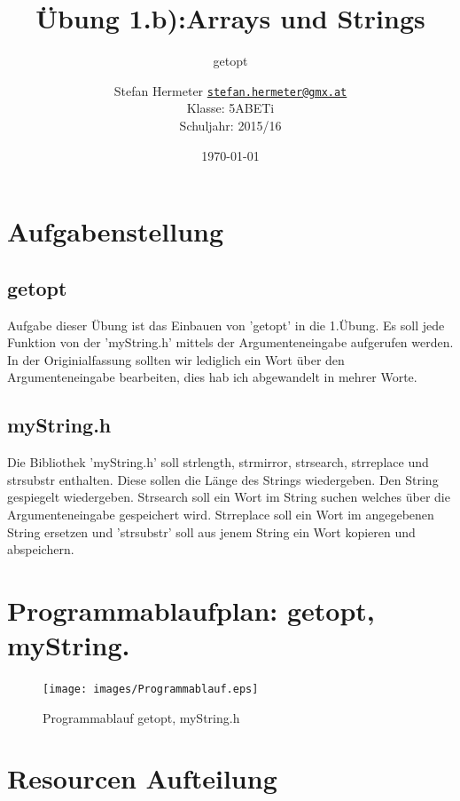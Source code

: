 \documentclass{scrartcl}
\newcommand{\mytitle}{Übung 1.b)}
\begin{document}
\title{\mytitle:Arrays und Strings}
\subtitle{getopt}
\date{\today}
\author{Stefan Hermeter \texttt{\href{mailto:stefan.hermeter@gmx.at}{stefan.hermeter@gmx.at}}\\
  Klasse: 5ABETi\\
  Schuljahr: 2015/16}
\maketitle
{}
\newpage
\tableofcontents
\listoffigures
\newpage
{}
\section{Aufgabenstellung}
\subsection{getopt}
Aufgabe dieser Übung ist das Einbauen von 'getopt' in die 1.Übung. Es soll jede Funktion von der 'myString.h' mittels der Argumenteneingabe aufgerufen werden. In der Originialfassung sollten wir lediglich ein Wort über den Argumenteneingabe bearbeiten, dies hab ich abgewandelt in mehrer Worte.

\subsection{myString.h}
Die Bibliothek 'myString.h' soll strlength, strmirror, strsearch, strreplace und strsubstr enthalten. Diese sollen die Länge des Strings wiedergeben. Den String gespiegelt wiedergeben. Strsearch soll ein Wort im String suchen welches über die Argumenteneingabe gespeichert wird. Strreplace soll ein Wort im angegebenen String ersetzen und 'strsubstr' soll aus jenem String ein Wort kopieren und abspeichern.

\section{Programmablaufplan: getopt, myString.}
\begin{figure}[H]
  \centering
  \texttt{[image: images/Programmablauf.eps]}
  \caption{Programmablauf getopt, myString.h}
  \label{fig:digraph}
\end{figure}

\newpage
\section{Resourcen Aufteilung}
\end{document}

